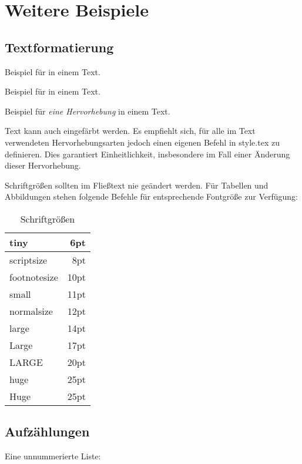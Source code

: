 \chapter{Weitere Beispiele}
\label{chp:Weitere_Beispiele}

\section{Textformatierung}
\label{sec:Textformatierung}

Beispiel für  in einem Text.

Beispiel für  in einem Text.

Beispiel für \emph{eine Hervorhebung} in einem Text.

Text kann auch {\color{red}eingefärbt} werden.
Es empfiehlt sich, für alle im Text verwendeten Hervorhebungsarten jedoch einen eigenen Befehl in style.tex zu definieren.
Dies garantiert Einheitlichkeit, insbesondere im Fall einer Änderung dieser Hervorhebung.

Schriftgrößen sollten im Fließtext nie geändert werden. Für Tabellen und Abbildungen stehen folgende Befehle für entsprechende Fontgröße zur Verfügung:

\begin{table}[ht!]
	\selectfont
	\centering
	\begin{tabular}{|l|r|}
		\hline
		tiny & 6pt \\\hline
		scriptsize & 8pt \\\hline
		footnotesize & 10pt \\\hline
		small & 11pt \\\hline
		normalsize & 12pt \\\hline
		large & 14pt \\\hline
		Large & 17pt \\\hline
		LARGE & 20pt \\\hline
		huge & 25pt \\\hline
		Huge & 25pt \\\hline
	\end{tabular}
	\caption{Schriftgrößen}
	\label{tab:fontsize}
\end{table}

\section{Aufzählungen}
\label{sec:Aufzaehlungen}

Eine unnummerierte Liste:

